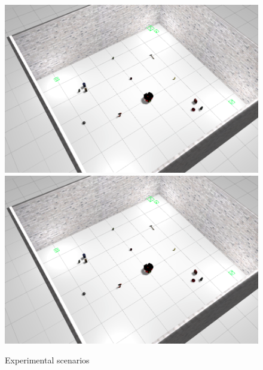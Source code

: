 
\begin{figure}
	\includegraphics[width=0.5\linewidth]{src/clustered.png}
	\includegraphics[width=0.5\linewidth]{src/clustered.png}
	\caption{Experimental scenarios}
\end{figure}